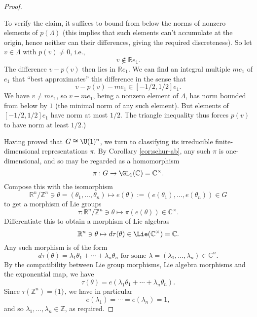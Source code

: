 \documentclass[reqno]{amsart} 
\begin{document}
\begin{proof}
\begin{enumerate}
    To verify the claim, it suffices to bound from below the norms of nonzero elements of $p(\Lambda)$ (this implies that such elements can't accumulate at the origin, hence neither can their differences, giving the required discreteness).  So let $v \in \Lambda$ with $p(v) \neq 0$, i.e.,
    \begin{equation*}
      v \notin \mathbb{R} e_1.
    \end{equation*}
    The difference $v - p(v)$ then lies in $\mathbb{R} e_1$.  We can find an integral multiple $m e_1$ of $e_1$ that ``best approximates'' this difference in the sense that
    \begin{equation*}
v - p(v) - m e_1 \in [-1/2,1/2] e_1.
\end{equation*}
 We have $v \neq m e_1$, so $v - m e_1$, being a nonzero element of $\Lambda$, has norm bounded from below by $1$ (the minimal norm of any such element).  But elements of $[-1/2,1/2] e_1$ have norm at most $1/2$.  The triangle inequality thus forces $p(v)$ to have norm at least $1/2$.)
  \end{enumerate}
  Having proved that $G \cong \U(1)^n$, we turn to classifying its irreducible finite-dimensional representations $\pi$.  By Corollary \ref{cor:schur-ab}, any such $\pi$ is one-dimensional, and so may be regarded as a homomorphism
  \begin{equation*}
    \pi : G \rightarrow \GL_1(\mathbb{C}) = \mathbb{C}^\times.
  \end{equation*}
  Compose this with the isomorphism
  \begin{equation*}
    \mathbb{R}^n/\mathbb{Z}^n \ni \theta = (\theta_1,\dotsc,\theta_n) \mapsto
    e(\theta)  := (e(\theta_1),\dotsc,e(\theta_n)) \in G
  \end{equation*}
  to get a morphism of Lie groups
  \begin{equation*}
    \tau : \mathbb{R}^n/\mathbb{Z}^n
    \ni \theta \mapsto \pi(e(\theta)) \in \mathbb{C}^\times.
  \end{equation*}
  Differentiate this to obtain a morphism of Lie algebras
  \begin{equation*}
    \mathbb{R}^n \ni \theta \mapsto d \tau(\theta) \in \Lie(\mathbb{C}^\times) = \mathbb{C}.
  \end{equation*}
  Any such morphism is of the form
  \begin{equation*}
    d \tau(\theta) = \lambda_1 \theta_1 + \dotsb + \lambda_n \theta_n \text{ for some $\lambda = (\lambda_1,\dotsc,\lambda_n) \in \mathbb{C}^n$.}
  \end{equation*}
  By the compatibility between Lie group morphisms, Lie algebra morphisms and the exponential map, we have
  \begin{equation*}
    \tau(\theta) = e(\lambda_1 \theta_1 + \dotsb + \lambda_n \theta_n).
  \end{equation*}
  Since $\tau(\mathbb{Z}^n) = \{1\}$, we have in particular
  \begin{equation*}
    e(\lambda_1) = \dotsb = e(\lambda_n) = 1,
  \end{equation*}
  and so $\lambda_1,\dotsc,\lambda_n \in \mathbb{Z}$, as required.
  

\end{proof}
\end{document}
